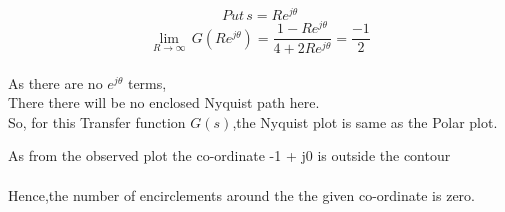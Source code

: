 \documentclass{beamer}
\begin{document}
\begin{frame}
    $$Put\,s=Re^{j\theta}$$
    $$\lim_{R\to \infty}\,G(Re^{j\theta})=\frac{1-Re^{j\theta}}{4+2Re^{j\theta}}=\frac{-1}{2}$$ \\
    \bigskip
    As there are no $e^{j\theta}$ terms, 
    \\
    There there will be no enclosed Nyquist path here. 
    \\
    So, for this Transfer function $G(s)$,the Nyquist plot is same as the Polar plot.
    
\end{frame}

\begin{frame}
As from the observed plot the co-ordinate -1 + j0 is outside the contour
\\
\bigskip
\\
Hence,the number of encirclements around the the given co-ordinate is zero.
\end{frame}
\end{document}
